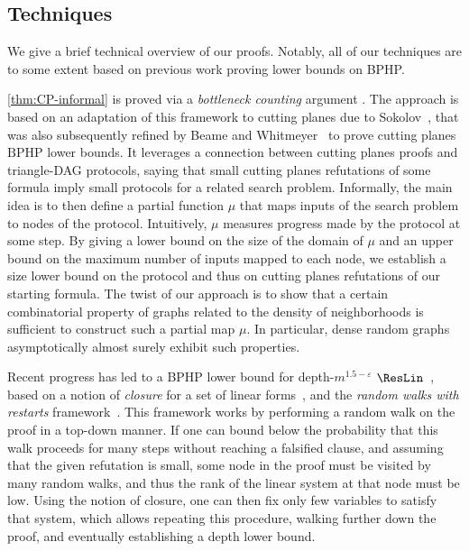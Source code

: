 \subsection{Techniques}
We give a brief technical overview of our proofs. Notably, all of our techniques are to some extent based on previous work proving lower bounds on BPHP. 

\autoref{thm:CP-informal} is proved via a \emph{bottleneck counting} argument \cite{HAKEN1999326}. The approach is based on
an adaptation of this framework to cutting planes due to Sokolov~\cite{Sokolov24RandomCNFs}, that was also subsequently refined by Beame and Whitmeyer~\cite{BeameW2025multiparty} to prove cutting planes $\mathrm{BPHP}$ lower bounds. It leverages a connection between cutting planes proofs and triangle-DAG protocols, saying that small cutting planes refutations of some formula imply small protocols for a related search problem. Informally, the main idea is to then define a partial function $\mu$ that maps inputs of the search problem to nodes of the protocol. Intuitively, $\mu$ measures progress made by the protocol at some step. By giving a lower bound on the size of the domain of $\mu$ and an upper bound on the maximum number of inputs mapped to each node, we establish a size lower bound on the protocol and thus on cutting planes refutations of our starting formula. The twist of our approach is to show that a certain combinatorial property of graphs related to the density of neighborhoods is sufficient to construct such a partial map $\mu$. In particular, dense random graphs asymptotically almost surely exhibit such properties.

Recent progress has led to a BPHP lower bound for depth-$m^{1.5-\varepsilon}$ $\ResLin$~\cite{BI25bphp}, 
based on a notion of \emph{closure} for a set of linear forms~\cite{EGI24regular}, and 
the \emph{random walks with restarts} framework~\cite{AI25lifting}.
This framework works by performing a random walk on the proof in a top-down manner. 
If one can bound below the probability that this walk proceeds for many steps without reaching a falsified clause, and assuming that the given refutation is small, some node in the proof must be visited by many random walks, and thus the rank of the linear system at that node must be low.
Using the notion of closure, one can then fix only few variables to satisfy that system, which allows repeating this procedure, walking further down the proof, and eventually establishing a depth lower bound. 

